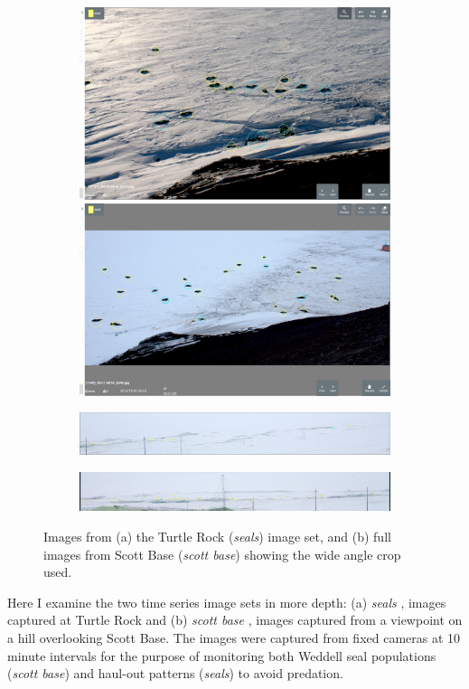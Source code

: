 \begin{figure}[ht!]
\centering
\begin{subfigure}[t]{1.0\linewidth}
  \includegraphics[width=0.475\linewidth]{figures/annotation/screenshots/seals_small2.png}
  \hfill
  \includegraphics[width=0.475\linewidth]{figures/annotation/screenshots/seals_small.png}
  \caption{}
\end{subfigure}

\begin{subfigure}[t]{1.0\linewidth}
  \includegraphics[width=1.0\linewidth]{figures/annotation/screenshots/cam_c.png}
\end{subfigure}

\begin{subfigure}[t]{1.0\linewidth}
  \includegraphics[width=1.0\linewidth]{figures/annotation/screenshots/cam_b.png}
  \caption{}
\end{subfigure}


\caption{ Images from (a) the Turtle Rock (\emph{seals}) image set, and (b) full images from Scott Base (\emph{scott base}) showing the wide angle crop used.  }
\label {fig:weddell_images}
\end{figure}


Here I examine the two time series image sets in more depth: (a) \emph{seals}  \cite{Eisert2015}, images captured at Turtle Rock and (b) \emph{scott base}  \cite{Eisert2019}, images captured from a viewpoint on a hill overlooking Scott Base. The images were captured from fixed cameras at 10 minute intervals for the purpose of monitoring both Weddell seal populations (\emph{scott base}) and haul-out patterns (\emph{seals}) to avoid predation. 


